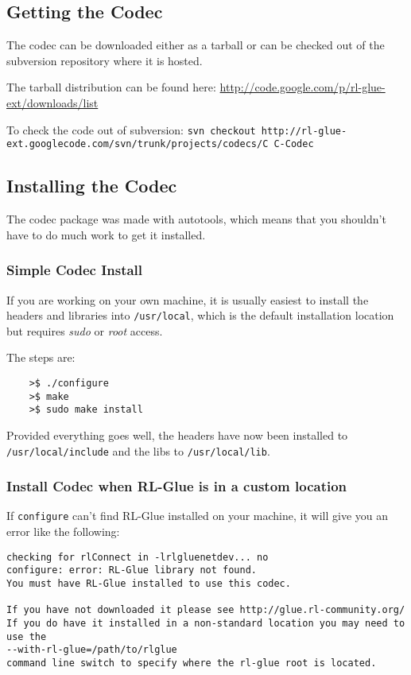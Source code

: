 \documentclass[11pt]{article}
\begin{document}
\subsection{Getting the Codec}
The codec can be downloaded either as a tarball or can be checked out of the subversion repository where it is hosted.

The tarball distribution can be found here:\newline
\url{http://code.google.com/p/rl-glue-ext/downloads/list}


To check the code out of subversion:\newline
\texttt{svn checkout http://rl-glue-ext.googlecode.com/svn/trunk/projects/codecs/C C-Codec}

\subsection{Installing the Codec}
The codec package was made with autotools, which means that you shouldn't have to do much work to get it installed.  

\subsubsection{Simple Codec Install}
If you are working on your own machine, it is usually easiest to install the headers and libraries into \texttt{/usr/local}, which is the default installation location but requires \textit{sudo} or \textit{root} access.

The steps are:
\begin{verbatim}
	>$ ./configure
	>$ make
	>$ sudo make install
\end{verbatim}

Provided everything goes well, the headers have now been installed to \texttt{/usr/local/include} and the libs to \texttt{/usr/local/lib}.

\subsubsection{Install Codec when RL-Glue is in a custom location}

If \texttt{configure} can't find RL-Glue installed on your machine, it will give you an error like the following:
\begin{verbatim}
checking for rlConnect in -lrlgluenetdev... no
configure: error: RL-Glue library not found.
You must have RL-Glue installed to use this codec. 
	
If you have not downloaded it please see http://glue.rl-community.org/
If you do have it installed in a non-standard location you may need to use the 
--with-rl-glue=/path/to/rlglue 
command line switch to specify where the rl-glue root is located.
\end{verbatim}
\end{document}
